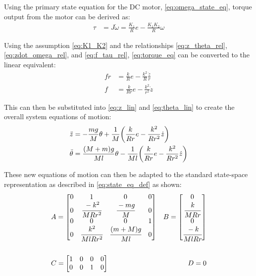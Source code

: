 \documentclass[]{article}
\begin{document}
		Using the primary state equation for the DC motor, \eqref{eq:omega_state_eq}, torque output from the motor can be derived as:
		\begin{align}
			\tau &= J \dot{\omega} = \frac{K_1}{R} e - \frac{K_1 K_2}{R} \omega \label{eq:torque_eq}
		\end{align}
		
		Using the assumption \eqref{eq:K1_K2} and the relationships \eqref{eq:z_theta_rel}, \eqref{eq:zdot_omega_rel}, and \eqref{eq:f_tau_rel}, \eqref{eq:torque_eq} can be converted to the linear equivalent:
		\begin{align}
			f r &= \frac{k}{R} e - \frac{k^2}{R} \frac{\dot{z}}{r} \nonumber\\
			f &= \frac{k}{R r} e - \frac{k^2}{r^2} \dot{z} \label{eq:f_def}
		\end{align}
		
		This can then be substituted into \eqref{eq:z_lin} and \eqref{eq:theta_lin} to create the overall system equations of motion:
		\begin{align}
			\ddot{z} &= - \frac{mg}{M} \theta + \frac{1}{M} \qty(\frac{k}{Rr}e - \frac{k^2}{R r^2} \dot{z}) \label{eq:z_pend_eq}\\
			\ddot{\theta} &= \frac{(M+m)g}{M l} \theta - \frac{1}{M l} \qty(\frac{k}{R r} e - \frac{k^2}{R r^2}\dot{z}) \label{eq:theta_pend_eq}
		\end{align}
	
		These new equations of motion can then be adapted to the standard state-space representation as described in \eqref{eq:state_eq_def} as shown:
		\begin{equation}
			\begin{aligned}
				&A = \mqty[	0 & 1 					& 0 					& 0\\
							0 & \cfrac{-k^2}{MRr^2}	& \cfrac{-mg}{M} 		& 0 \\
							0 & 0 					& 0 					& 1\\
							0 & \cfrac{k^2}{MlRr^2}	& \cfrac{(m+M)g}{Ml}	& 0	]
				&B = \mqty[	0\\
							\cfrac{k}{MRr}\\
							0\\
							\cfrac{-k}{MlRr}] \\ &&\\
				&C = \mqty[	1 & 0 & 0 & 0\\
							0 & 0 & 1 & 0]
				&D = 0
			\end{aligned}
			\label{eq:pendulum_state_matrices}
		\end{equation}
	
\end{document}
